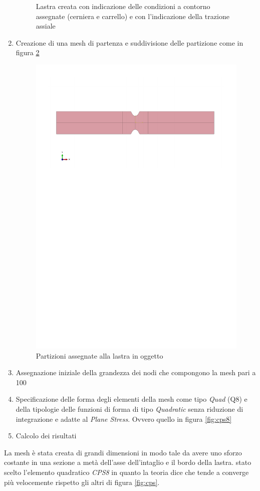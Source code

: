 \begin{enumerate}
\begin{figure}[htb]
        \caption{Lastra creata con indicazione delle condizioni a contorno assegnate (cerniera e carrello) e con l'indicazione della trazione assiale}
        \label{fig:LastraCaricata}
    \end{figure}
    \item Creazione di una mesh di partenza e suddivisione delle partizione come in figura \ref{fig:Partizioni}
    \begin{figure}[htb]
        \centering
        \includegraphics[width=\textwidth]{rel2/img2/Partizione.pdf}
        \caption{Partizioni assegnate alla lastra in oggetto}
        \label{fig:Partizioni}
    \end{figure}
    \item Assegnazione iniziale della grandezza dei nodi che compongono la mesh pari a \SI{100}{}
    \item Specificazione delle forma degli elementi della mesh come tipo \emph{Quad} (Q8) e della tipologie delle funzioni di forma di tipo \emph{Quadratic} senza riduzione di integrazione e adatte al \emph{Plane Stress}. Ovvero quello in figura \ref{fig:cps8}
    \item Calcolo dei risultati
\end{enumerate}
La mesh è stata creata di grandi dimensioni in modo tale da avere uno sforzo costante in una sezione a metà dell’asse dell’intaglio e il bordo della lastra.
\e stato scelto l'elemento quadratico \emph{CPS8} in quanto la teoria dice che tende a converge più velocemente rispetto gli altri di figura \ref{fig:cps}.

